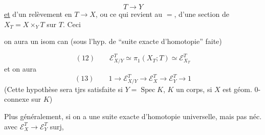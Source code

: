 
\[
T\longrightarrow Y
\]
\uline{et} d'un relèvement en $T\longrightarrow X$, ou ce qui revient au $=$, d'une section de $X_T=X\times_YT$ sur $T$. Ceci 

\noindent
\begin{minipage}[t]{.45\linewidth}
\vspace{\baselineskip}
\end{minipage}\hfill
\begin{minipage}[t]{.51\linewidth}
\vspace{0pt}
on aura un isom can (sous l'hyp. de ``suite exacte d'homotopie'' faite)
\end{minipage}

\[
(12)\qquad \mathcal E_{X/Y}^T\simeq\pi_1(X_T;T)\simeq\mathcal E_{X_T}^T
\]
et on aura
\[
(13)\qquad 1\longrightarrow\mathcal E_{X/Y}^T\longrightarrow\mathcal E_X^T\longrightarrow\mathcal E_Y^T\longrightarrow1
\]
(Cette hypothèse sera tjrs satisfaite si $Y=\operatorname{Spec}K$, $K$ un corps, si $X$ est géom. $0$-connexe sur $K$)

Plus généralement, si on a une suite exacte d'homotopie universelle, mais pas néc. avec $\mathcal E_X^T\longrightarrow\mathcal E_Y^T$ surj,

